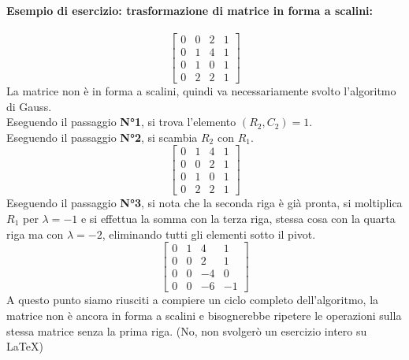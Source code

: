 \documentclass[12pt,a4paper]{article}
\begin{document}
\paragraph{Esempio di esercizio: trasformazione di matrice in forma a scalini:}
\[
\begin{bmatrix}
0 & 0 & 2 & 1 \\
0 & 1 & 4 & 1 \\
0 & 1 & 0 & 1 \\
0 & 2 & 2 & 1
\end{bmatrix}
\]
La matrice non è in forma a scalini, quindi va necessariamente svolto l'algoritmo di Gauss.\\
Eseguendo il passaggio \textbf{N°1}, si trova l'elemento $(R_2,C_2) = 1$.\\
Eseguendo il passaggio \textbf{N°2}, si scambia $R_2$ con $R_1$.
\[
\begin{bmatrix}
0 & 1 & 4 & 1 \\
0 & 0 & 2 & 1 \\
0 & 1 & 0 & 1 \\
0 & 2 & 2 & 1
\end{bmatrix}
\]
Eseguendo il passaggio \textbf{N°3}, si nota che la seconda riga è già pronta, si moltiplica
$R_1$ per $\lambda = -1$ e si effettua la somma con la terza riga, stessa cosa con la quarta riga ma con $\lambda = -2$, eliminando tutti gli elementi sotto il pivot.
\[
\begin{bmatrix}
0 & 1 & 4 & 1 \\
0 & 0 & 2 & 1 \\
0 & 0 & -4 & 0 \\
0 & 0 & -6 & -1
\end{bmatrix}
\]
A questo punto siamo riusciti a compiere un ciclo completo dell'algoritmo, la matrice non è ancora in forma a scalini e bisognerebbe ripetere le operazioni sulla stessa matrice senza la prima riga. (No, non svolgerò un esercizio intero su LaTeX)
\end{document}
